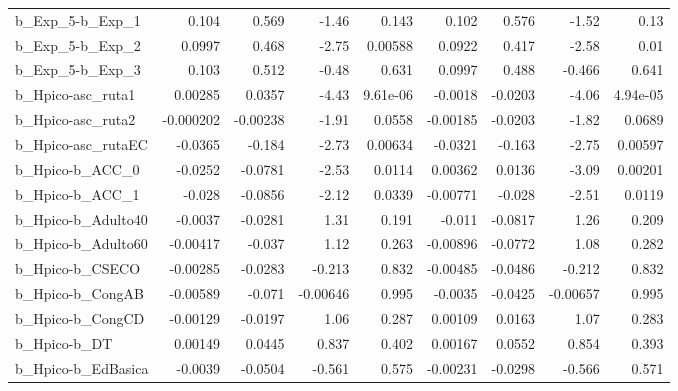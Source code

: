 \begin{tabular}{lrrrrrrrr}
b\_Exp\_5-b\_Exp\_1            &       0.104 &        0.569 &     -1.46 &    0.143 &      0.102 &       0.576 &        -1.52 &          0.13 \\
b\_Exp\_5-b\_Exp\_2            &      0.0997 &        0.468 &     -2.75 &  0.00588 &     0.0922 &       0.417 &        -2.58 &          0.01 \\
b\_Exp\_5-b\_Exp\_3            &       0.103 &        0.512 &     -0.48 &    0.631 &     0.0997 &       0.488 &       -0.466 &         0.641 \\
b\_Hpico-asc\_ruta1          &     0.00285 &       0.0357 &     -4.43 & 9.61e-06 &    -0.0018 &     -0.0203 &        -4.06 &      4.94e-05 \\
b\_Hpico-asc\_ruta2          &   -0.000202 &     -0.00238 &     -1.91 &   0.0558 &   -0.00185 &     -0.0203 &        -1.82 &        0.0689 \\
b\_Hpico-asc\_rutaEC         &     -0.0365 &       -0.184 &     -2.73 &  0.00634 &    -0.0321 &      -0.163 &        -2.75 &       0.00597 \\
b\_Hpico-b\_ACC\_0            &     -0.0252 &      -0.0781 &     -2.53 &   0.0114 &    0.00362 &      0.0136 &        -3.09 &       0.00201 \\
b\_Hpico-b\_ACC\_1            &      -0.028 &      -0.0856 &     -2.12 &   0.0339 &   -0.00771 &      -0.028 &        -2.51 &        0.0119 \\
b\_Hpico-b\_Adulto40         &     -0.0037 &      -0.0281 &      1.31 &    0.191 &     -0.011 &     -0.0817 &         1.26 &         0.209 \\
b\_Hpico-b\_Adulto60         &    -0.00417 &       -0.037 &      1.12 &    0.263 &   -0.00896 &     -0.0772 &         1.08 &         0.282 \\
b\_Hpico-b\_CSECO            &    -0.00285 &      -0.0283 &    -0.213 &    0.832 &   -0.00485 &     -0.0486 &       -0.212 &         0.832 \\
b\_Hpico-b\_CongAB           &    -0.00589 &       -0.071 &  -0.00646 &    0.995 &    -0.0035 &     -0.0425 &     -0.00657 &         0.995 \\
b\_Hpico-b\_CongCD           &    -0.00129 &      -0.0197 &      1.06 &    0.287 &    0.00109 &      0.0163 &         1.07 &         0.283 \\
b\_Hpico-b\_DT               &     0.00149 &       0.0445 &     0.837 &    0.402 &    0.00167 &      0.0552 &        0.854 &         0.393 \\
b\_Hpico-b\_EdBasica         &     -0.0039 &      -0.0504 &    -0.561 &    0.575 &   -0.00231 &     -0.0298 &       -0.566 &         0.571 \\

\end{tabular}
